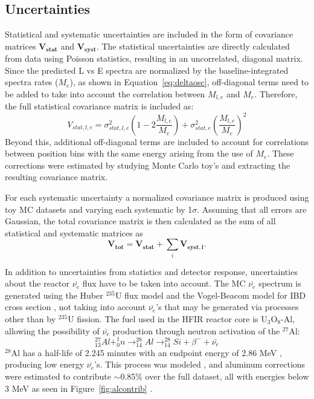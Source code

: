 \subsection{Uncertainties}

Statistical and systematic uncertainties are included in the form of covariance matrices $\mathbf{V_{stat}}$ and $\mathbf{V_{syst}}$.
The statistical uncertainties are directly calculated from data using Poisson statistics, resulting in an uncorrelated, diagonal matrix.
Since the predicted L vs E spectra are normalized by the baseline-integrated spectra rates ($M_e$), as shown in Equation~\ref{eq:deltaosc}, off-diagonal terms need to be added to take into account the correlation between $M_{l,e}$ and $M_e$.
Therefore, the full statistical covariance matrix is included as:
\begin{equation}
	V_{stat,l,e} = \sigma^2_{stat,l,e}\left(1-2\frac{M_{l,e}}{M_e}\right) + \sigma^2_{stat,e}\left(\frac{M_{l,e}}{M_e}\right)^2
\end{equation}
Beyond this, additional off-diagonal terms are included to account for correlations between position bins with the same energy arising from the use of $M_e$.
These corrections were estimated by studying Monte Carlo toy's and extracting the resulting covariance matrix.

For each systematic uncertainty a normalized covariance matrix is produced using toy MC datasets and varying each systematic by 1$\sigma$.
Assuming that all errors are Gaussian, the total covariance matrix is then calculated as the sum of all statistical and systematic matrices as
\begin{equation}
	\mathbf{V_{tot}} = \mathbf{V_{stat}} + \sum_{i}\mathbf{V_{syst,i}}.
\end{equation}

In addition to uncertainties from statistics and detector response, uncertainties about the reactor $\bar{\nu_{e}}$ flux have to be taken into account.
The MC $\bar{\nu_{e}}$ spectrum is generated using the Huber $^{235}$U flux model \cite{Huber} and the Vogel-Beacom model for IBD cross section \cite{Vogel:1999zy}, not taking into account $\bar{\nu_{e}}$'s that may be generated via processes other than by $^{235}$U fission.
The fuel used in the HFIR reactor core is U$_3$O$_8$-Al, allowing the possibility of $\bar{\nu_{e}}$ production through neutron activation of the $^{27}$Al:
\begin{equation}
	^{27}_{13}Al + ^1_0n \rightarrow ^{28}_{14}Al \rightarrow ^{28}_{14}Si + \beta^- + \bar{\nu_{e}}
\end{equation}
$^{28}$Al has a half-life of 2.245 minutes with an endpoint energy of 2.86 MeV \cite{ENSDF}, producing low energy $\bar{\nu_{e}}$'s.
This process was modeled \cite{ConantThesis}, and aluminum corrections were estimated to contribute $\sim$0.85\% over the full dataset, all with energies below 3 MeV as seen in Figure~\ref{fig:alcontrib} \cite{PSurukuchi:2338}. 

